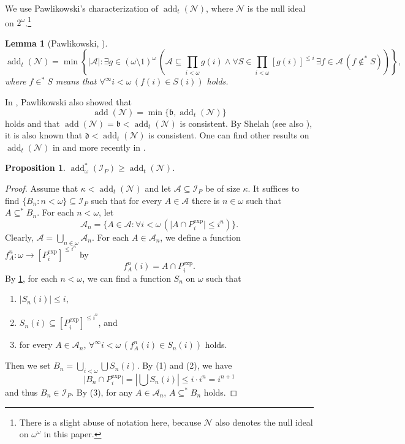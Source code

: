 \documentclass[a4paper,12pt]{amsart}
\newtheorem{prop}[thm]{Proposition}
\newtheorem{lem}[thm]{Lemma}
\theoremstyle{definition}
\numberwithin{thm}{section}
\numberwithin{equation}{section}
\newcommand{\bb}{\mathfrak{b}}
\newcommand{\dd}{\mathfrak{d}}
\newcommand{\n}{\mathcal{N}}
\DeclareMathOperator{\add}{add}
\newcommand{\I}{\mathscr{I}}
\renewcommand{\subset}{\subseteq}
\begin{document}
    We use Pawlikowski's characterization of $\add_t{(\mathcal{N})}$, where $\n$ is the null ideal on $2^\omega$.\footnote{There is a slight abuse of notation here, because $\n$ also denotes the null ideal on $\omega^\omega$ in this paper.}
    
    \begin{lem}[Pawlikowski, {\cite[Lemma 2.2]{Paw85}}]\label{lem:addtN}
		\[
		\add_t(\mathcal{N}) = \min \left\{\lvert\mathcal{A}\rvert : \exists g\in(\omega\setminus 1)^\omega\,\left(\mathcal{A}\subset\prod_{i<\omega}g(i) \land \forall S\in\prod_{i<\omega}[g(i)]^{\leq i}\,\exists f \in\mathcal{A}\,(f\not\in^* S)\right)\right\},
		\]
        where $f\in^* S$ means that $\forall^\infty i<\omega\,(f(i)\in S(i))$ holds.
	\end{lem}

    In \cite{Paw85}, Pawlikowski also showed that
    \[
    \add(\mathcal{N}) = \min\{\bb, \add_t(\mathcal{N})\}
    \]
    holds and that $\add(\mathcal{N}) = \bb < \add_t(\mathcal{N})$ is consistent. By Shelah \cite{She92} (see also \cite[Section 3.4, Theorem 2]{Bre95}), it is also known that $\dd<\add_t(\mathcal{N})$ is consistent. One can find other results on $\add_t(\mathcal{N})$ in \cite[Section 2.7]{BJ95} and more recently in \cite{CMRM25}.

    \begin{prop} \label{prop:addstaromega_IP}
		$\add^*_\omega(\I_P) \geq \add_t(\mathcal{N})$.
	\end{prop}
	\begin{proof}
		Assume that $\kappa < \add_t(\mathcal{N})$ and let $\mathcal{A} \subseteq \I_P$ be of size $\kappa$. It suffices to find $\{B_n:n<\omega\}\subset\I_P$ such that for every $A \in \mathcal{A}$ there is $n\in\omega$ such that $A \subseteq^* B_n$. For each $n<\omega$, let
        \[
        \mathcal{A}_n = \{ A \in \mathcal{A} : \forall i<\omega\,(\lvert A\cap P_i^\mathrm{exp}\rvert \leq i^n)\}.
        \]
        Clearly, $\mathcal{A} = \bigcup_{n \in \omega} \mathcal{A}_n$. For each $A \in \mathcal{A}_n$, we define a function $f^n_A\colon\omega\to[P_i^\mathrm{exp}]^{\leq i^n}$ by
        \[
        f^n_A (i) = A \cap P_i^\mathrm{exp}.
        \]
        By \cref{lem:addtN}, for each $n<\omega$, we can find a function $S_n$ on $\omega$ such that 
		\begin{enumerate}
			\item $\lvert S_n(i)\rvert \leq i$,
			\item $S_n(i) \subset [P_i^\mathrm{exp}]^{\leq i^n}$, and
			\item for every $A \in \mathcal{A}_n$, $\forall^\infty i<\omega\,(f^n_A(i) \in S_n(i))$ holds.
		\end{enumerate}
        Then we set $B_n = \bigcup_{i<\omega} \bigcup  S_n(i)$.
        By (1) and (2), we have
        \[
        \lvert B_n \cap P_i^\mathrm{exp}\rvert = \left\lvert\bigcup S_n(i)\right\rvert \leq i \cdot i^n = i^{n+1}
        \]
        and thus $B_n \in \I_P$. By (3), for any $A\in\mathcal{A}_n$, $A\subset^* B_n$ holds.
	\end{proof}
\end{document}
